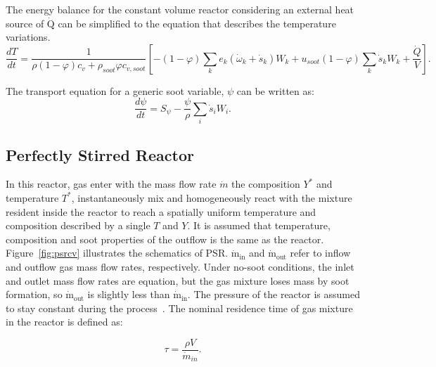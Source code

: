 The energy balance for the constant volume reactor considering an external heat source of $\mathrm{\dot{Q}}$ can be simplified to the equation that describes the temperature variations.
\begin{equation}
	\frac{d T}{d t}=
	\frac{1}{\rho (1-\varphi) c_v+\rho_{soot}\varphi c_{v,soot}}
	\left[
		-(1-\varphi)\sum_k e_k
			\left(
				\dot{\omega}_k+\dot{s}_k
			\right) W_k
		+u_{soot}(1-\varphi)\sum_k \dot{s}_k W_k
		+\frac{\dot{Q}}{V}
	\right]
	\label{eqn:energyconstuv}.
\end{equation}



The transport equation for a generic soot variable, $\psi$ can be written as:
\begin{equation}
	\frac{d \psi}{d t}= S_{\psi} - \frac{\psi}{\rho} \sum_i \dot{s}_i W_i
	\label{eqn:sootconstuv}.
\end{equation}

\subsection{Perfectly Stirred Reactor}
In this reactor, gas enter with the mass flow rate $\dot{m}$ the composition $Y^\ast$ and temperature $T^\ast$, instantaneously mix and homogeneously react with the mixture resident inside the reactor to reach a spatially uniform temperature and composition described by a single $T$ and $Y$. It is assumed that temperature, composition and soot properties of the outflow is the same as the reactor. Figure~\ref{fig:psrcv} illustrates the schematics of PSR. $\mathrm{\dot{m}_{in}}$ and $\mathrm{\dot{m}_{out}}$ refer to inflow and outflow gas mass flow rates, respectively. Under no-soot conditions, the inlet and outlet mass flow rates are equation, but the gas mixture loses mass by soot formation, so $\mathrm{\dot{m}_{out}}$ is slightly less than $\mathrm{\dot{m}_{in}}$. The pressure of the reactor is assumed to stay constant during the process~\citep{kee2017chemically}. The nominal residence time of gas mixture in the reactor is defined as:

\begin{equation}
	\tau = \frac{\rho V}{\dot{m}_{in}}
	\label{eqn:taupsr}.
\end{equation} 

 

